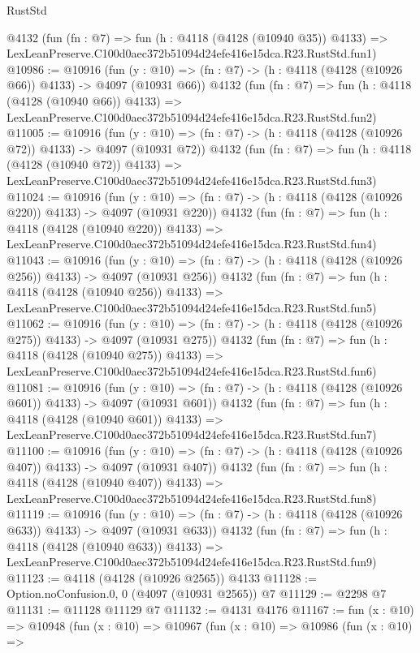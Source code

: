 \begin{lexlean}{RustStd}
\begin{coremodule}
    @4132
    (fun (fn : @7) =>
    fun (h : @4118 (@4128 (@10940 @35)) @4133) =>
    LexLeanPreserve.C100d0aec372b51094d24efe416e15dca.R23.RustStd.fun1)
@10986 := @10916
    (fun (y : @10) => (fn : @7) -> (h : @4118 (@4128 (@10926 @66)) @4133) -> @4097 (@10931 @66))
    @4132
    (fun (fn : @7) =>
    fun (h : @4118 (@4128 (@10940 @66)) @4133) =>
    LexLeanPreserve.C100d0aec372b51094d24efe416e15dca.R23.RustStd.fun2)
@11005 := @10916
    (fun (y : @10) => (fn : @7) -> (h : @4118 (@4128 (@10926 @72)) @4133) -> @4097 (@10931 @72))
    @4132
    (fun (fn : @7) =>
    fun (h : @4118 (@4128 (@10940 @72)) @4133) =>
    LexLeanPreserve.C100d0aec372b51094d24efe416e15dca.R23.RustStd.fun3)
@11024 := @10916
    (fun (y : @10) => (fn : @7) -> (h : @4118 (@4128 (@10926 @220)) @4133) -> @4097 (@10931 @220))
    @4132
    (fun (fn : @7) =>
    fun (h : @4118 (@4128 (@10940 @220)) @4133) =>
    LexLeanPreserve.C100d0aec372b51094d24efe416e15dca.R23.RustStd.fun4)
@11043 := @10916
    (fun (y : @10) => (fn : @7) -> (h : @4118 (@4128 (@10926 @256)) @4133) -> @4097 (@10931 @256))
    @4132
    (fun (fn : @7) =>
    fun (h : @4118 (@4128 (@10940 @256)) @4133) =>
    LexLeanPreserve.C100d0aec372b51094d24efe416e15dca.R23.RustStd.fun5)
@11062 := @10916
    (fun (y : @10) => (fn : @7) -> (h : @4118 (@4128 (@10926 @275)) @4133) -> @4097 (@10931 @275))
    @4132
    (fun (fn : @7) =>
    fun (h : @4118 (@4128 (@10940 @275)) @4133) =>
    LexLeanPreserve.C100d0aec372b51094d24efe416e15dca.R23.RustStd.fun6)
@11081 := @10916
    (fun (y : @10) => (fn : @7) -> (h : @4118 (@4128 (@10926 @601)) @4133) -> @4097 (@10931 @601))
    @4132
    (fun (fn : @7) =>
    fun (h : @4118 (@4128 (@10940 @601)) @4133) =>
    LexLeanPreserve.C100d0aec372b51094d24efe416e15dca.R23.RustStd.fun7)
@11100 := @10916
    (fun (y : @10) => (fn : @7) -> (h : @4118 (@4128 (@10926 @407)) @4133) -> @4097 (@10931 @407))
    @4132
    (fun (fn : @7) =>
    fun (h : @4118 (@4128 (@10940 @407)) @4133) =>
    LexLeanPreserve.C100d0aec372b51094d24efe416e15dca.R23.RustStd.fun8)
@11119 := @10916
    (fun (y : @10) => (fn : @7) -> (h : @4118 (@4128 (@10926 @633)) @4133) -> @4097 (@10931 @633))
    @4132
    (fun (fn : @7) =>
    fun (h : @4118 (@4128 (@10940 @633)) @4133) =>
    LexLeanPreserve.C100d0aec372b51094d24efe416e15dca.R23.RustStd.fun9)
@11123 := @4118 (@4128 (@10926 @2565)) @4133
@11128 := Option.noConfusion.{0, 0} (@4097 (@10931 @2565)) @7
@11129 := @2298 @7
@11131 := @11128 @11129 @7
@11132 := @4131 @4176
@11167 := fun (x : @10) =>
  @10948
    (fun (x : @10) =>
    @10967
      (fun (x : @10) =>
      @10986
        (fun (x : @10) =>

\end{coremodule}
\end{lexlean}
